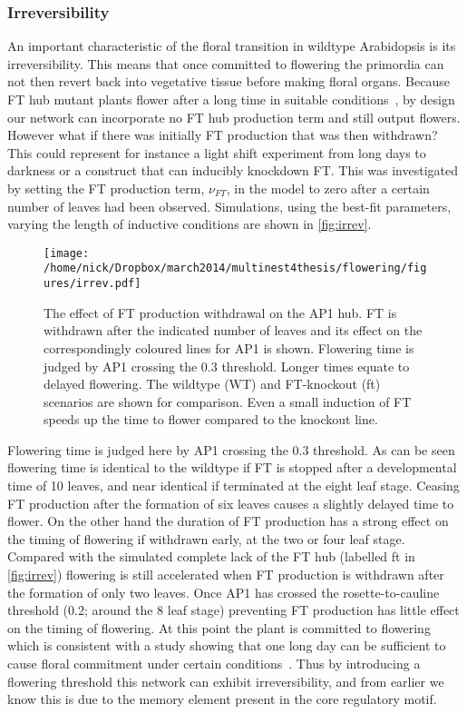 \subsubsection{Irreversibility}
An important characteristic of the floral transition in wildtype Arabidopsis is its irreversibility.
This means that once committed to flowering the primordia can not then revert back into vegetative tissue before making floral organs.
Because FT hub mutant plants flower after a long time in suitable conditions~\cite{kim2013}, by design our network can incorporate no FT hub production term and still output flowers.
However what if there was initially FT production that was then withdrawn?
This could represent for instance a light shift experiment from long days to darkness or a construct that can inducibly knockdown FT.
This was investigated by setting the FT production term, $\nu_{FT}$, in the model to zero after a certain number of leaves had been observed.
Simulations, using the best-fit parameters, varying the length of inductive conditions are shown in \autoref{fig:irrev}.
\begin{figure*}[!htb]
\centering
\texttt{[image: /home/nick/Dropbox/march2014/multinest4thesis/flowering/figures/irrev.pdf]}
\caption{The effect of FT production withdrawal on the AP1 hub.
FT is withdrawn after the indicated number of leaves and its effect on the correspondingly coloured lines for AP1 is shown.
Flowering time is judged by AP1 crossing the 0.3 threshold.
Longer times equate to delayed flowering.
The wildtype (WT) and FT-knockout (ft) scenarios are shown for comparison.
Even a small induction of FT speeds up the time to flower compared to the knockout line.
}
\label{fig:irrev}
\end{figure*}
Flowering time is judged here by AP1 crossing the 0.3 threshold.
As can be seen flowering time is identical to the wildtype if FT is stopped after a developmental time of 10 leaves, and near identical if terminated at the eight leaf stage.
Ceasing FT production after the formation of six leaves causes a slightly delayed time to flower.
On the other hand the duration of FT production has a strong effect on the timing of flowering if withdrawn early, at the two or four leaf stage.
Compared with the simulated complete lack of the FT hub (labelled ft in \autoref{fig:irrev}) flowering is still accelerated when FT production is withdrawn after the formation of only two leaves.
Once AP1 has crossed the rosette-to-cauline threshold (0.2; around the 8 leaf stage) preventing FT production has little effect on the timing of flowering.
At this point the plant is committed to flowering which is consistent with a study showing that one long day can be sufficient to cause floral commitment under certain conditions~\cite{corbesier1996}.
Thus by introducing a flowering threshold this network can exhibit irreversibility, and from earlier we know this is due to the memory element present in the core regulatory motif.

